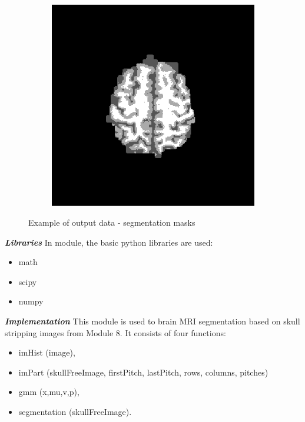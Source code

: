 \begin{figure}[H]
\begin{subfigure}[b]{0.25\linewidth}
	\end{subfigure}
	\begin{subfigure}[b]{0.25\linewidth}
		\includegraphics[width=\linewidth]{figures/Module_09/m09_18}
	\end{subfigure}
	\caption{Example of output data - segmentation masks} 
	\label{fig:figures/m09_1678}
\end{figure} 

\textbf{\textit{Libraries}}
In module, the basic python libraries are used:
\begin{itemize}
	\item math
	\item scipy 
	\item numpy
\end{itemize}

\textbf{\textit{Implementation}}
This module is used to brain MRI segmentation based on skull stripping images from Module 8. It consists of four functions:
\begin{itemize}
	\item imHist (image),
	\item imPart (skullFreeImage, firstPitch, lastPitch, rows, columns, pitches)
	\item gmm (x,mu,v,p),
	\item segmentation (skullFreeImage).
\end{itemize}

